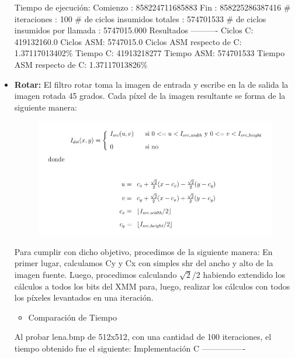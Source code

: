 \documentclass[10pt, a4paper]{article}
\begin{document}
\begin{itemize}
Tiempo de ejecución:\newline
  Comienzo                          : 858224711685883\newline
  Fin                               : 858225286387416\newline
  \# iteraciones                     : 100\newline
  \# de ciclos insumidos totales     : 574701533\newline
  \# de ciclos insumidos por llamada : 5747015.000\newline
\newline
Resultados\newline
----------
Ciclos C:                 419132160.0\newline
Ciclos ASM:               5747015.0\newline
Ciclos ASM respecto de C: 1.37117013402\%\newline
Tiempo C:                 41913218277\newline
Tiempo ASM:               574701533\newline
Tiempo ASM respecto de C: 1.37117013826\%\newline

\item {\textbf{Rotar:}} 
El filtro rotar toma la imagen de entrada y escribe en la de salida la imagen rotada 45 grados. Cada píxel de la imagen resultante se forma de la siguiente manera:
\begin{figure}[H] %
\begin{center}
\includegraphics[width=400pt]{./rotar.jpg}
\end{center}
\end{figure}
Para cumplir con dicho objetivo, procedimos de la siguiente manera:\newline
En primer lugar, calculamos Cy y Cx con simples shr del ancho y alto de la imagen fuente. Luego, procedimos calculando $\sqrt{2}$/2 habiendo extendido los cálculos a todos los bits del XMM para, luego, realizar los cálculos con todos los píxeles levantados en una iteración.
\begin{itemize}
\item{Comparación de Tiempo}
\end{itemize}
Al probar lena.bmp de 512x512, con una cantidad de 100 iteraciones, el tiempo obtenido fue el siguiente:\newline
Implementación C\newline
----------------


\end{itemize}
\end{document}
